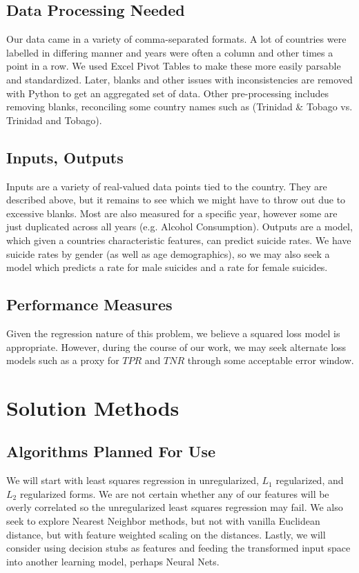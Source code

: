 \documentclass{article}
\begin{document}
\begin{multicols}{2}
\subsection{Data Processing Needed} Our data came in a variety of comma-separated formats. A lot of countries were labelled in differing manner and years were often a column and other times a point in a row. We used Excel Pivot Tables to make these more easily parsable and standardized. Later, blanks and other issues with inconsistencies are removed with Python to get an aggregated set of data. Other pre-processing includes removing blanks, reconciling some country names such as (Trinidad \& Tobago vs. Trinidad and Tobago).
\subsection{Inputs, Outputs} Inputs are a variety of real-valued data points tied to the country. They are described above, but it remains to see which we might have to throw out due to excessive blanks. Most are also measured for a specific year, however some are just duplicated across all years (e.g. Alcohol Consumption). Outputs are a model, which given a countries characteristic features, can predict suicide rates. We have suicide rates by gender (as well as age demographics), so we may also seek a model which predicts a rate for male suicides and a rate for female suicides.
\subsection{Performance Measures} Given the regression nature of this problem, we believe a squared loss model is appropriate. However, during the course of our work, we may seek alternate loss models such as a proxy for $TPR$ and $TNR$ through some acceptable error window.


\section{Solution Methods}
\subsection{Algorithms Planned For Use} We will start with least squares regression in unregularized, $L_1$ regularized, and $L_2$ regularized forms. We are not certain whether any of our features will be overly correlated so the unregularized least squares regression may fail. We also seek to explore Nearest Neighbor methods, but not with vanilla Euclidean distance, but with feature weighted scaling on the distances. Lastly, we will consider using decision stubs as features and feeding the transformed input space into another learning model, perhaps Neural Nets.

\end{multicols}
\end{document}

